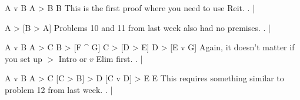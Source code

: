 \argument
 A v B
 A > B
\argumentline
 B
\endargument
\Hint This is the first proof where you need to use Reit.
	\answer
	. | 
	\endfitchproof
	\endanswer

\argument

\argumentline
 A > [B > A]
\endargument
\Hint Problems 10 and 11 from last week also had no premises.
	\answer\resetfitchsetup
	. | 
	\endfitchproof
	\endanswer

\argument
 A v B
 A > C
 B > [F ^ G]
 C > [D > E]
\argumentline
 D > [E v G]
\endargument
\Hint Again, it doesn't matter if you set up $>$ Intro or $v$ Elim first.
	\answer
	. | 
	\endfitchproof
	\endanswer

\argument
 A v B
 A > C
 [C > B] > D
 [C v D] > E
\argumentline
 E
\endargument
\Hint This requires something similar to problem 12 from last week.
	\answer
	. | 
	\endfitchproof
	\endanswer

\endproblems
\bye
